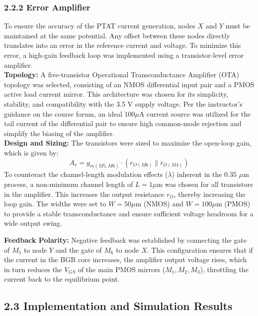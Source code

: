 \documentclass[12pt]{article}
\begin{document}
\subsubsection*{2.2.2 Error Amplifier}

To ensure the accuracy of the PTAT current generation, nodes $X$ and $Y$ must be maintained at the same potential. Any offset between these nodes directly translates into an error in the reference current and voltage. To minimize this error, a high-gain feedback loop was implemented using a transistor-level error amplifier.\\
\newline
\noindent
\textbf{Topology:}
A five-transistor Operational Transconductance Amplifier (OTA) topology was selected, consisting of an NMOS differential input pair and a PMOS active load current mirror. This architecture was chosen for its simplicity, stability, and compatibility with the 3.5 V supply voltage. Per the instructor's guidance on the course forum, an ideal $100 \mu\text{A}$ current source was utilized for the tail current of the differential pair to ensure high common-mode rejection and simplify the biasing of the amplifier.\\
\newline
\noindent
\textbf{Design and Sizing:}
The transistors were sized to maximize the open-loop gain, which is given by:
\begin{equation*}
A_v = g_{m(M5,M6)} \cdot (r_{O(M6)} \parallel r_{O(M4)})
\end{equation*}
To counteract the channel-length modulation effects ($\lambda$) inherent in the 0.35 $\mu\text{m}$ process, a non-minimum channel length of $L = 1 \mu\text{m}$ was chosen for all transistors in the amplifier. This increases the output resistance $r_O$, thereby increasing the loop gain. The widths were set to $W = 50 \mu\text{m}$ (NMOS) and $W = 100 \mu\text{m}$ (PMOS) to provide a stable transconductance and ensure sufficient voltage headroom for a wide output swing.

\noindent
\textbf{Feedback Polarity:}
Negative feedback was established by connecting the gate of $M_5$ to node $Y$ and the gate of $M_6$ to node $X$. This configuration ensures that if the current in the BGR core increases, the amplifier output voltage rises, which in turn reduces the $V_{GS}$ of the main PMOS mirrors ($M_1, M_2, M_3$), throttling the current back to the equilibrium point.

\subsection*{2.3 Implementation and Simulation Results}
\end{document}
